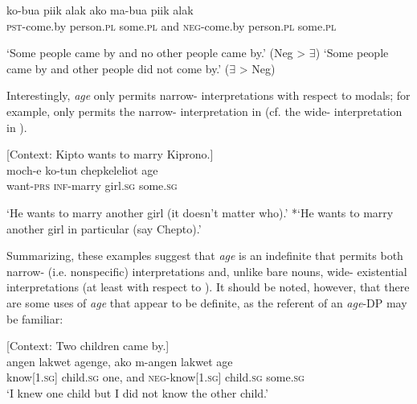 \documentclass[output=paper,newtxmath,modfonts,nonflat,hidelinks]{langsci/langscibook}
\begin{document}
\begin{exe}
\ex \label{ex:landman:scopepl}
  \gll ko-bua piik alak ako ma-bua piik alak\\	
	   \textsc{pst}-come.by person.\textsc{pl} some.\textsc{pl} and \textsc{neg}-come.by person.\textsc{pl} some.\textsc{pl}\\
  \begin{xlist}
  \ex \label{ex:landman:narrowpl}‘Some people came by and no other people came by.’ (Neg > $\exists$)
  \ex \label{ex:landman:widepl} ‘Some people came by and other people did not come by.’  ($\exists$  > Neg)  
  \end{xlist}   
\end{exe}

 Interestingly, \textit{age} only permits narrow- interpretations with respect to modals; for example,  only permits the narrow- interpretation in  (cf. the wide- interpretation in ).

\begin{exe}
\ex \label{ex:landman:29} [Context: Kipto wants to marry Kiprono.]\\
 \gll moch-e	ko-tun	chepkeleliot age\\	
want-\textsc{prs} \textsc{inf}-marry girl.\textsc{sg} some.\textsc{sg}\\
\begin{xlist}
  \ex \label{ex:landman:30}‘He wants to marry another girl (it doesn't matter who).’
  \ex \label{ex:landman:31} *‘He wants to marry another girl in particular (say Chepto).’ 
  \end{xlist}   
\end{exe}

Summarizing, these examples suggest that \textit{age} is an indefinite that permits both narrow- (i.e. nonspecific) interpretations and, unlike bare nouns, wide- existential interpretations (at least with respect to ). It should be noted, however, that there are some uses of \textit{age} that appear to be definite, as the referent of an \textit{age}-DP may be familiar:

\ea \label{ex:landman:modalage} [Context: Two children came by.]\\
\gll angen lakwet agenge, ako m-angen lakwet age\\
     know[\textsc{1.sg}] child.\textsc{sg} one, and \textsc{neg}-know[\textsc{1.sg}] child.\textsc{sg} some.\textsc{sg}\\
\glt ‘I knew one child but I did not know the other child.’ 
\z
\end{document}

